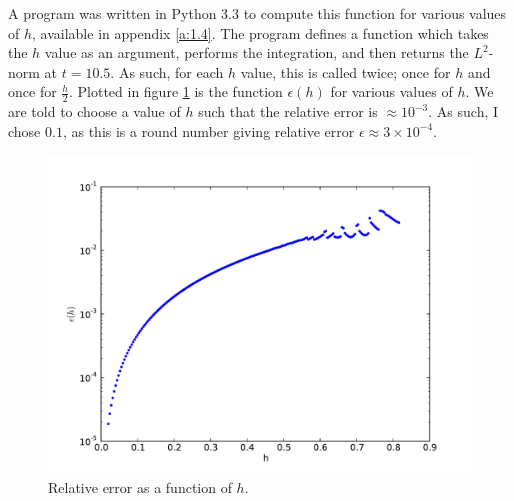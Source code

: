 \documentclass[10pt]{article}
\begin{document}
A program was written in Python 3.3 to compute this function for various values of
$h$, available in appendix \ref{a:1.4}. The program defines a function which takes
the $h$ value as an argument, performs the integration, and then returns the $L^2$-norm
at $t=10.5$. As such, for each $h$ value, this is called twice; once for $h$ and once for
$\frac{h}{2}$.
Plotted in figure \ref{f:hstudy1} is the function $\epsilon(h)$ for various values of $h$.
We are told to choose a value of $h$ such that the relative error is $\approx 10^{-3}$.
As such, I chose $0.1$, as this is a round number giving relative error
$\epsilon \approx 3\times10^{-4}$.
\begin{figure}
  \centering
  \includegraphics[width=\textwidth]{1/Error.pdf}
  \caption{Relative error as a function of $h$.}
  \label{f:hstudy1}
\end{figure}


\clearpage
\end{document}
